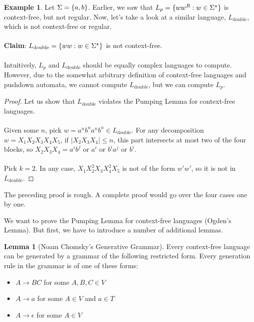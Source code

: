 \documentclass[]{article}
\DeclarePairedDelimiter{\set}{\lbrace}{\rbrace}
\theoremstyle{definition}
\newtheorem*{lemma}{Lemma}
\newtheorem{ex}{Example}[section]
\begin{document}
      \begin{ex}
        Let $\Sigma = \set{a, b}$. Earlier, we saw that $L_p = \set{w w^R : w \in \Sigma^\star}$ is context-free, but not regular. Now, let's take a look at a similar language, $L_\text{double}$, which is not context-free or regular.
        \\ \\
        \textbf{Claim}: $L_\text{double} = \set{ ww : w  \in \Sigma^\star }$ is not context-free.
        \\ \\
        Intuitively, $L_p$ and $L_\text{double}$ should be equally complex languages to compute. However, due to the somewhat arbitrary definition of context-free languages and pushdown automata, we cannot compute $L_\text{double}$, but we can compute $L_p$.

        \begin{proof}
          Let us show that $L_\text{double}$ violates the Pumping Lemma for context-free languages.
          \\ \\
          Given some $n$, pick $w = a^n b^n a^n b^n \in L_\text{double}$. For any decomposition $w = X_1 X_2 X_3 X_4 X_5$, if $|X_2 X_3 X_4| \le n$, this part intersects at most two of the four blocks, so $X_2 X_3 X_4 = a^i b^j$ or $a^i$ or $b^i a^j$ or $b^i$.
          \\ \\
          Pick $k = 2$. In any case, $X_1 X_2^2 X_3 X_4^2 X_5$ is not of the form $w' w'$, so it is not in $L_\text{double}$.
        \end{proof}

        The preceding proof is rough. A complete proof would go over the four cases one by one.
      \end{ex}

      We want to prove the Pumping Lemma for context-free languages (Ogden's Lemma). But first, we have to introduce a number of additional lemmas.

      \begin{lemma}[Noam Chomsky's Generative Grammar]
        Every context-free language can be generated by a grammar of the following restricted form. Every generation rule in the grammar is of one of these forms:
        \begin{itemize}
          \item $A \to BC$ for some $A, B, C \in V$
          \item $A \to a$ for some $A \in V$ and $a \in T$
          \item $A \to \epsilon$ for some $A \in V$
        \end{itemize}
      \end{lemma}
\end{document}
